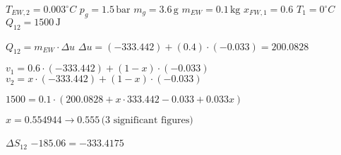 \( T_{EW,2} = 0.003^\circ C \)  
\( p_{g} = 1.5 \, \text{bar} \)  
\( m_{g} = 3.6 \, \text{g} \)  
\( m_{EW} = 0.1 \, \text{kg} \)  
\( x_{FW,1} = 0.6 \)  
\( T_{1} = 0^\circ C \)  
\( Q_{12} = 1500 \, \text{J} \)  

\( Q_{12} = m_{EW} \cdot \Delta u \)  
\( \Delta u = (-333.442) + (0.4) \cdot (-0.033) = 200.0828 \)  

\( v_{1} = 0.6 \cdot (-333.442) + (1 - x) \cdot (-0.033) \)  
\( v_{2} = x \cdot (-333.442) + (1 - x) \cdot (-0.033) \)  

\( 1500 = 0.1 \cdot (200.0828 + x \cdot 333.442 - 0.033 + 0.033x) \)  

\( x = 0.554944 \rightarrow 0.555 \, \text{(3 significant figures)} \)  

\( \Delta S_{12} \)  
\( -185.06 = -333.4175 \)